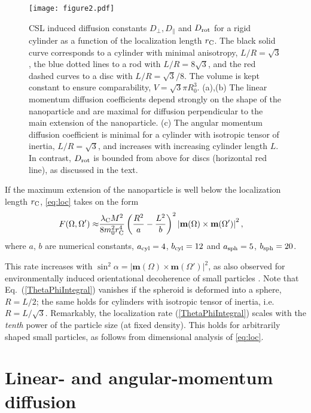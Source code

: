 \documentclass[%
 twocolumn,
 amsmath,amssymb,
 aps,
 pra,
]{revtex4-1}
\begin{document}
\begin{figure*}
  \centering
  \texttt{[image: figure2.pdf]}
  \caption{CSL induced diffusion constants $D_{\perp},D_{\parallel}$ and $D_{\rm rot}$ for a rigid cylinder as a function of the localization length $r_{\rm C}$. The black solid curve corresponds to a cylinder with minimal anisotropy, $L/R=\sqrt{3}$, the blue dotted lines to a rod with $L/R=8\sqrt{3}$, and the red dashed curves to a disc with $L/R=\sqrt{3}/8$. The volume is kept constant to ensure comparability, $V = \sqrt{3} \pi R_0^3$. (a),(b) The linear momentum diffusion coefficients depend strongly  on the shape of the nanoparticle and are maximal for diffusion perpendicular to the main extension of the nanoparticle. (c) The angular momentum diffusion coefficient is minimal for a cylinder with isotropic tensor of inertia, $L / R = \sqrt{3}$, and increases with increasing cylinder length $L$. In contrast, $D_{{\rm rot}}$ is bounded from above for discs (horizontal red line), as discussed in the text.}
\label{fig:DiffusionPlots}
\end{figure*}

If the maximum extension of the nanoparticle is well below the localization length $r_{\rm C}$, \eqref{eq:loc} takes on the form
\begin{align}
F(\Omega,\Omega')
\approx&\frac{\lambda_{\rm C} M^2}{8 m_0^2r^4_{\rm C}}\left(\frac{R^2}{a} - \frac{L^2}{b}\right)^2 \left \vert\textbf{m}(\Omega)\times\textbf{m}(\Omega') \right \vert^2,
\label{ThetaPhiIntegral}
\end{align}
where $a$, $b$ are numerical constants, $a_{\rm cyl}=4$, $b_{\rm cyl}=12$ and $a_{\rm sph}=5$, $b_{\rm sph}=20$. 

This rate increases with $\sin^2 \alpha= \vert\textbf{m}(\Omega)\times\textbf{m}(\Omega')  \vert^2$, as also observed for environmentally induced orientational decoherence of small particles \cite{stickler2016spatio,zhong2016}. Note that Eq.~(\ref{ThetaPhiIntegral}) vanishes if the spheroid is deformed into a sphere, $R=L/2$; the same holds for cylinders with isotropic tensor of inertia, i.e. $R=L/\sqrt{3}$. Remarkably, the localization rate (\ref{ThetaPhiIntegral}) scales with the \emph{tenth } power of the particle size (at fixed density). This holds for arbitrarily shaped small particles, as follows from dimensional analysis of \eqref{eq:loc}.

\section{Linear- and angular-momentum diffusion} 
\end{document}
